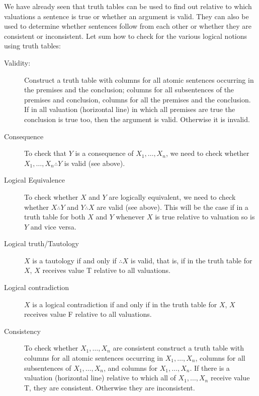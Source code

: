 We have already seen that truth tables can be used to find out relative to which valuations a sentence is true or whether an argument is valid. They can also be used to determine whether sentences follow from each other or whether they are consistent or inconsistent. Let sum how to check for the various logical notions using truth tables:

\begin{description}
\item[Validity:]Construct a truth table with columns for all atomic sentences occurring in the premises and the conclusion; columns for all subsentences of the premises and conclusion, columns for all the premises and the conclusion. If in all valuation (horizontal line) in which all premises are true the conclusion is true too, then the argument is valid. Otherwise it is invalid.
\item[Consequence]To check that $Y$ is a consequence of $X_1,\ldots,X_n$, we need to check whether $X_1,\ldots,X_n\therefore Y$ is valid (see above).
\item[Logical Equivalence] To check whether $X$ and $Y$ are logically equivalent, we need to check whether $X\therefore Y$ and $Y\therefore X$ are valid (see above). This will be the case if in a truth table for both $X$ and $Y$ whenever $X$ is true relative to valuation so is $Y$ and vice versa.
\item[Logical truth/Tautology] $X$ is a tautology if and only if $\therefore X$ is valid, that is, if in the truth table for $X$, $X$ receives value T relative to all valuations.
\item[Logical contradiction]  $X$ is a logical contradiction if and only if in the truth table for $X$, $X$ receives value F relative to all valuations.
\item[Consistency]To check whether $X_1,\ldots,X_n$ are consistent construct a truth table with columns for all atomic sentences occurring in $X_1,\ldots,X_n$, columns for all subsentences of $X_1,\ldots,X_n$, and columns for $X_1,\ldots,X_n$. If there is a valuation (horizontal line) relative to which all of $X_1,\ldots,X_n$ receive value T, they are consistent. Otherwise they are inconsistent.
\end{description}

